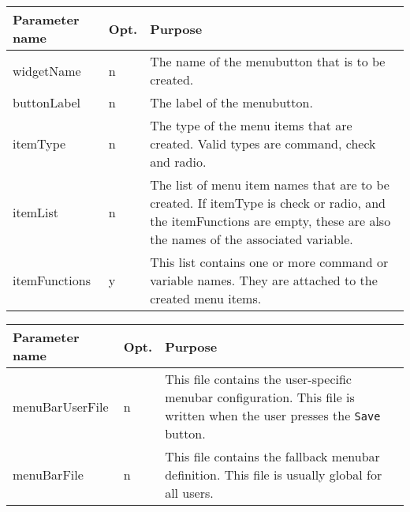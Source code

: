 {\newpage
\clearpage
\samepage \begin{figure}[ht]
  \centerline{
  \epsfysize=7.5cm
  }
  
  \label{fig:KeysymBox}
\end{figure}
}

{\newpage
\clearpage
\samepage \begin{tabular}{|l|l|p{6.5cm}|} \hline
Parameter name & Opt. & Purpose \\  \hline
widgetName     & n    & The name of the menubutton that is
                        to be created.\\  \hline
buttonLabel    & n    & The label of the menubutton.\\  \hline
itemType       & n    & The type of the menu items that are
                        created. Valid types are command,
                        check and radio.\\  \hline
itemList       & n    & The list of menu item names that are
                        to be created. If itemType is check
                        or radio, and the itemFunctions are
                        empty, these are also the names of
                        the associated variable.\\  \hline
itemFunctions  & y    & This list contains one or more
                        command or variable names. They are
                        attached to the created menu
                        items.\\  \hline
\end{tabular}
}

{\newpage
\clearpage
\samepage \begin{figure}[ht]
  \centerline{
  \epsfysize=4cm
  }
  
  \label{fig:MakeMButton}
\end{figure}
}

{\newpage
\clearpage
\samepage \begin{tabular}{|l|l|p{6.5cm}|} \hline
Parameter name  & Opt. & Purpose\\  \hline
menuBarUserFile & n    & This file contains the
                         user-specific menubar
                         configuration. This file is written
                         when the user presses the
                         {\tt Save\tt} button.\\  \hline
menuBarFile     & n    & This file contains the fallback
                         menubar definition. This file is
                         usually global for all users.\\  \hline
\end{tabular}
}

